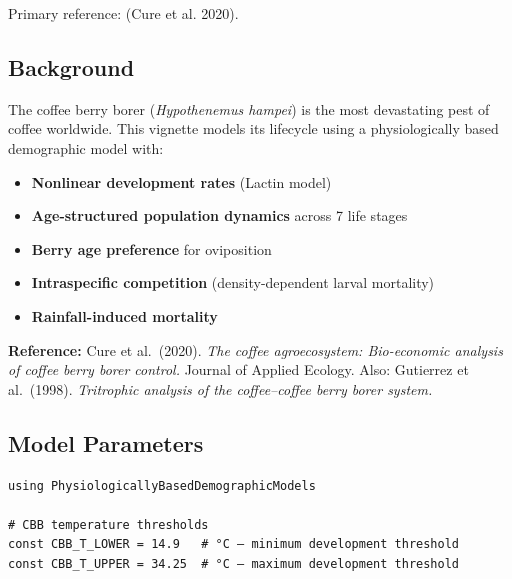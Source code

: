 Primary reference: (Cure et al. 2020).



\subsection{Background}



\label{13776314717791382304}{}


The coffee berry borer (\emph{Hypothenemus hampei}) is the most devastating pest of coffee worldwide. This vignette models its lifecycle using a physiologically based demographic model with:



\begin{itemize}
\item \textbf{Nonlinear development rates} (Lactin model)


\item \textbf{Age-structured population dynamics} across 7 life stages


\item \textbf{Berry age preference} for oviposition


\item \textbf{Intraspecific competition} (density-dependent larval mortality)


\item \textbf{Rainfall-induced mortality}

\end{itemize}


\textbf{Reference:} Cure et al.~(2020). \emph{The coffee agroecosystem: Bio-economic analysis of coffee berry borer control.} Journal of Applied Ecology. Also: Gutierrez et al.~(1998). \emph{Tritrophic analysis of the coffee–coffee berry borer system.}



\subsection{Model Parameters}



\label{8409430649752429329}{}



\begin{verbatim}
using PhysiologicallyBasedDemographicModels

# CBB temperature thresholds
const CBB_T_LOWER = 14.9   # °C — minimum development threshold
const CBB_T_UPPER = 34.25  # °C — maximum development threshold
\end{verbatim}




